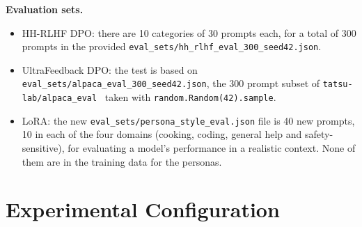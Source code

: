 \documentclass[10pt]{article}
\begin{document}
\textbf{Evaluation sets.}
\begin{itemize}
\item HH-RLHF DPO: there are 10 categories of 30 prompts each, for a total of 300 prompts in the provided \texttt{eval\_sets/hh\_rlhf\_eval\_300\_seed42.json}.
\item UltraFeedback DPO: the test is based on \texttt{eval\_sets/alpaca\_eval\_300\_seed42.json}, the 300 prompt subset of \texttt{tatsu-lab/alpaca\_eval}~\cite{alpacaeval} taken with \texttt{random.Random(42).sample}.
\item LoRA: the new \texttt{eval\_sets/persona\_style\_eval.json} file is 40 new prompts, 10 in each of the four domains (cooking, coding, general help and safety-sensitive), for evaluating a model's performance in a realistic context. None of them are in the training data for the personas.
\end{itemize}

\section{Experimental Configuration}
\end{document}
